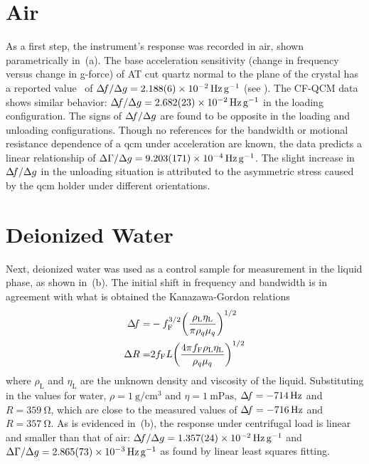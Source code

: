 \section{Air}
As a first step, the instrument's response was recorded in air, shown
parametrically in \,(a).  The base acceleration
sensitivity (change in frequency versus change in g-force) of AT cut quartz
normal to the plane of the crystal has a reported
value~\cite{valdois2794influence} of $\df/\Delta g
  =\SI{2.188+-0.006e-2}{\hertz\per\g}$ (see
).  The CF-QCM data shows similar
behavior: $\df/\Delta g =\SI{2.682+-0.023e-2}{\hertz\per\g}$ in the loading
configuration.  The signs of $\Delta\!f/\Delta g$ are found to be opposite in the
loading and unloading configurations.  Though no references for
the bandwidth or motional resistance dependence of a \gls{qcm} under
acceleration are known, the data predicts a linear relationship of $\dg/\Delta g =
  \SI{9.203+-0.171e-4}{\hertz\per\g}$.  The slight increase in $\Delta\!f/\Delta g$
in the unloading situation is attributed to the asymmetric stress caused by
the \gls{qcm} holder under different orientations.

\section{Deionized Water}
Next, deionized water was used as a control sample for measurement in the
liquid phase, as shown in \,(b).  The initial shift in
frequency and bandwidth is in agreement with what is obtained the
Kanazawa-Gordon relations~\cite{kanazawa1985frequency}
\begin{align}
  \Delta\!f=      & -f_{\text{F}}^{3/2}{\left(\frac{\rho_{\text{L}}\eta_{\text{L}}}{\pi\rho_{q}\mu_{q}}\right)}^{1/2} \\
  \Delta R= & 2f_{\text{F}}L{\left(\frac{4\pi
    f_{\text{F}}\rho_{\text{L}}\eta_{\text{L}}}{\rho_{q}\mu_{q}}\right)}^{1/2}
\end{align}
where $\rho_{\text{L}}$ and $\eta_{\text{L}}$ are the unknown density and
viscosity of the liquid.   Substituting in the values for water,
$\rho=\SI{1}{\gram\per\centi\meter\cubed}$ and
$\eta=\SI{1}{\milli\pascal\second}$, $\Delta\!f = \SI{-714}{\hertz}$ and
$R=\SI{359}{\ohm}$, which are close to the measured values of $\Delta\!f =
  \SI{-716}{\hertz}$ and $R=\SI{357}{\ohm}$.  As is evidenced in
\,(b), the response under centrifugal
load is linear and smaller than that of air: $\df/\Delta g=
  \SI{1.357+-0.024e-2}{\hertz \per\g}$ and $\dg/\Delta g=
  \SI{2.865+-0.073e-3}{\hertz\per\g}$ as found by linear least squares fitting.

